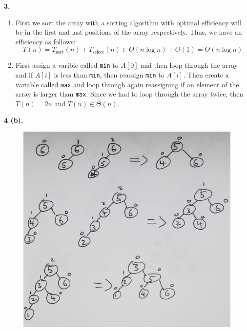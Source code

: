 \documentclass[letterpaper, 11pt]{article}
\newcommand{\hwnumber}[1]{\newpage \noindent\textbf{#1.} \smallskip}
\begin{document}
\hwnumber{3}
\begin{enumerate}[label = (\alph*)]
  \item First we sort the array with a sorting algorithm with optimal
    efficiency will be in the first and last positions of the array
    respectively. Thus, we have an efficiency as follows:
    \[T(n) = T_{\text{sort}}(n) + T_{\text{select}}(n) \in \Theta(n\log n) +
    \Theta(1) = \Theta(n \log n)\]

  \item First assign a varible called \texttt{min} to \(A[0]\) and then loop
    through the array and if \(A[i]\) is less than \texttt{min}, then reassign
    \texttt{min} to \(A[i]\). Then create a variable called \texttt{max} and
    loop through again reassigning if an element of the array is larger than
    \texttt{max}. Since we had to loop through the array twice, then \(T(n) =
    2n\) and \(T(n) \in \Theta(n)\).
\end{enumerate}

\newpage
\hwnumber{4 (b)}
\begin{figure}[h!]
  \centering
  \includegraphics[width=\linewidth]{pics/num_4.jpg}
\end{figure}
\end{document}
